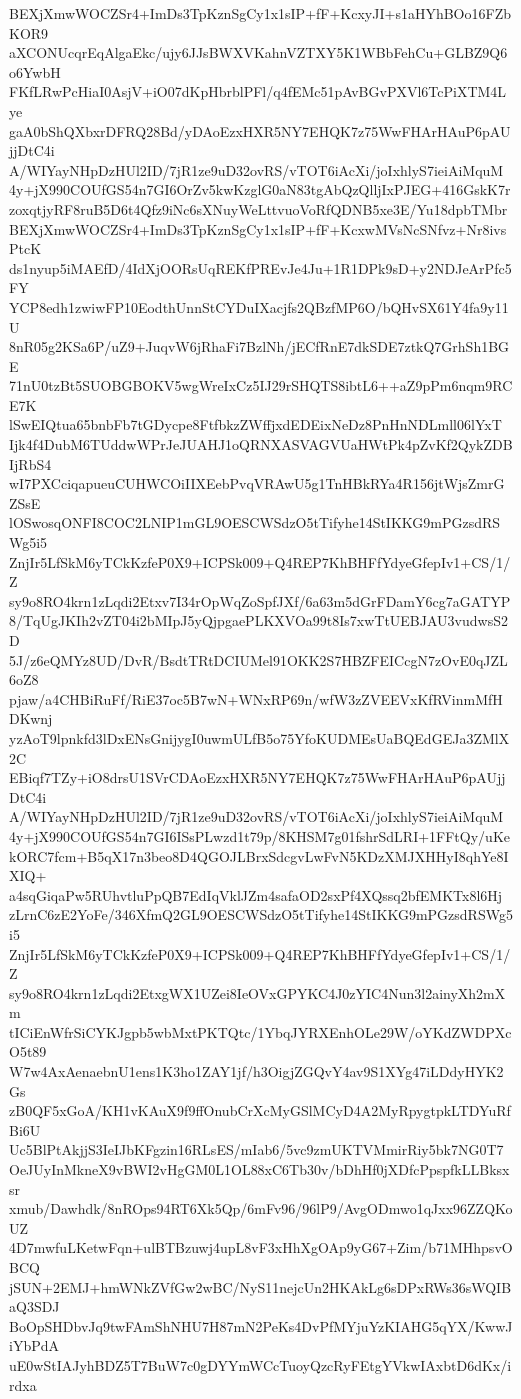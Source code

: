 BEXjXmwWOCZSr4+ImDs3TpKznSgCy1x1sIP+fF+KcxyJI+s1aHYhBOo16FZbKOR9
aXCONUcqrEqAlgaEkc/ujy6JJsBWXVKahnVZTXY5K1WBbFehCu+GLBZ9Q6o6YwbH
FKfLRwPcHiaI0AsjV+iO07dKpHbrblPFl/q4fEMc51pAvBGvPXVl6TcPiXTM4Lye
gaA0bShQXbxrDFRQ28Bd/yDAoEzxHXR5NY7EHQK7z75WwFHArHAuP6pAUjjDtC4i
A/WIYayNHpDzHUl2ID/7jR1ze9uD32ovRS/vTOT6iAcXi/joIxhlyS7ieiAiMquM
4y+jX990COUfGS54n7GI6OrZv5kwKzglG0aN83tgAbQzQlljIxPJEG+416GskK7r
zoxqtjyRF8ruB5D6t4Qfz9iNc6sXNuyWeLttvuoVoRfQDNB5xe3E/Yu18dpbTMbr
BEXjXmwWOCZSr4+ImDs3TpKznSgCy1x1sIP+fF+KcxwMVsNcSNfvz+Nr8ivsPtcK
ds1nyup5iMAEfD/4IdXjOORsUqREKfPREvJe4Ju+1R1DPk9sD+y2NDJeArPfc5FY
YCP8edh1zwiwFP10EodthUnnStCYDuIXacjfs2QBzfMP6O/bQHvSX61Y4fa9y11U
8nR05g2KSa6P/uZ9+JuqvW6jRhaFi7BzlNh/jECfRnE7dkSDE7ztkQ7GrhSh1BGE
71nU0tzBt5SUOBGBOKV5wgWreIxCz5IJ29rSHQTS8ibtL6++aZ9pPm6nqm9RCE7K
lSwEIQtua65bnbFb7tGDycpe8FtfbkzZWffjxdEDEixNeDz8PnHnNDLmll06lYxT
Ijk4f4DubM6TUddwWPrJeJUAHJ1oQRNXASVAGVUaHWtPk4pZvKf2QykZDBIjRbS4
wI7PXCciqapueuCUHWCOiIIXEebPvqVRAwU5g1TnHBkRYa4R156jtWjsZmrGZSsE
lOSwosqONFI8COC2LNIP1mGL9OESCWSdzO5tTifyhe14StIKKG9mPGzsdRSWg5i5
ZnjIr5LfSkM6yTCkKzfeP0X9+ICPSk009+Q4REP7KhBHFfYdyeGfepIv1+CS/1/Z
sy9o8RO4krn1zLqdi2Etxv7I34rOpWqZoSpfJXf/6a63m5dGrFDamY6cg7aGATYP
8/TqUgJKIh2vZT04i2bMIpJ5yQjpgaePLKXVOa99t8Is7xwTtUEBJAU3vudwsS2D
5J/z6eQMYz8UD/DvR/BsdtTRtDCIUMel91OKK2S7HBZFEICcgN7zOvE0qJZL6oZ8
pjaw/a4CHBiRuFf/RiE37oc5B7wN+WNxRP69n/wfW3zZVEEVxKfRVinmMfHDKwnj
yzAoT9lpnkfd3lDxENsGnijygI0uwmULfB5o75YfoKUDMEsUaBQEdGEJa3ZMlX2C
EBiqf7TZy+iO8drsU1SVrCDAoEzxHXR5NY7EHQK7z75WwFHArHAuP6pAUjjDtC4i
A/WIYayNHpDzHUl2ID/7jR1ze9uD32ovRS/vTOT6iAcXi/joIxhlyS7ieiAiMquM
4y+jX990COUfGS54n7GI6ISsPLwzd1t79p/8KHSM7g01fshrSdLRI+1FFtQy/uKe
kORC7fcm+B5qX17n3beo8D4QGOJLBrxSdcgvLwFvN5KDzXMJXHHyI8qhYe8IXIQ+
a4sqGiqaPw5RUhvtluPpQB7EdIqVklJZm4safaOD2sxPf4XQssq2bfEMKTx8l6Hj
zLrnC6zE2YoFe/346XfmQ2GL9OESCWSdzO5tTifyhe14StIKKG9mPGzsdRSWg5i5
ZnjIr5LfSkM6yTCkKzfeP0X9+ICPSk009+Q4REP7KhBHFfYdyeGfepIv1+CS/1/Z
sy9o8RO4krn1zLqdi2EtxgWX1UZei8IeOVxGPYKC4J0zYIC4Nun3l2ainyXh2mXm
tICiEnWfrSiCYKJgpb5wbMxtPKTQtc/1YbqJYRXEnhOLe29W/oYKdZWDPXcO5t89
W7w4AxAenaebnU1ens1K3ho1ZAY1jf/h3OigjZGQvY4av9S1XYg47iLDdyHYK2Gs
zB0QF5xGoA/KH1vKAuX9f9ffOnubCrXcMyGSlMCyD4A2MyRpygtpkLTDYuRfBi6U
Uc5BlPtAkjjS3IeIJbKFgzin16RLsES/mIab6/5vc9zmUKTVMmirRiy5bk7NG0T7
OeJUyInMkneX9vBWI2vHgGM0L1OL88xC6Tb30v/bDhHf0jXDfcPpspfkLLBksxsr
xmub/Dawhdk/8nROps94RT6Xk5Qp/6mFv96/96lP9/AvgODmwo1qJxx96ZZQKoUZ
4D7mwfuLKetwFqn+ulBTBzuwj4upL8vF3xHhXgOAp9yG67+Zim/b71MHhpsvOBCQ
jSUN+2EMJ+hmWNkZVfGw2wBC/NyS11nejcUn2HKAkLg6sDPxRWs36sWQIBaQ3SDJ
BoOpSHDbvJq9twFAmShNHU7H87mN2PeKs4DvPfMYjuYzKIAHG5qYX/KwwJiYbPdA
uE0wStIAJyhBDZ5T7BuW7c0gDYYmWCcTuoyQzcRyFEtgYVkwIAxbtD6dKx/irdxa
